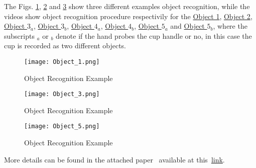 The Figs. \ref{fig:Object_1}, \ref{fig:Object_3} and \ref{fig:Object_5} show three different examples object recognition, while the videos show object recognition procedure respectivily for the \href{https://www.youtube.com/watch?v=d_WPQ3WmHRg}{Object 1}, \href{https://www.youtube.com/watch?v=PG38VObdl6o}{Object 2}, \href{https://www.youtube.com/watch?v=bIYhLXm90hc}{Object $3_a$}, \href{https://www.youtube.com/watch?v=IXVlBAoGKho}{Object $3_b$}, \href{https://www.youtube.com/watch?v=Efmm6-JHcxU}{Object $4_a$}, \href{https://www.youtube.com/watch?v=NZElSV_AnJ4}{Object $4_b$}, \href{https://www.youtube.com/watch?v=mDDb5oTaHzM}{Object $5_a$} and \href{https://www.youtube.com/watch?v=sLzU39zffFY}{Object $5_b$}, where the subscripts $_a$ or $_b$ denote if the hand probes the cup handle or no, in this case the cup is recorded as two different objects. 

\begin{figure}[h]
\centering
\texttt{[image: Object\_1.png]}
\caption{Object Recognition Example}
\label{fig:Object_1}
\end{figure} 

\begin{figure}[h]
\centering
\texttt{[image: Object\_3.png]}
\caption{Object Recognition Example}
\label{fig:Object_3}
\end{figure} 

\begin{figure}[h]
\centering
\texttt{[image: Object\_5.png]}
\caption{Object Recognition Example}
\label{fig:Object_5}
\end{figure}  



More details can be found in the attached paper~\cite{Santaera:ICRA:2015} available at this~\href{./attachedPapers/ReconstructionPosturesImuMeasurements.pdf}{link}.
